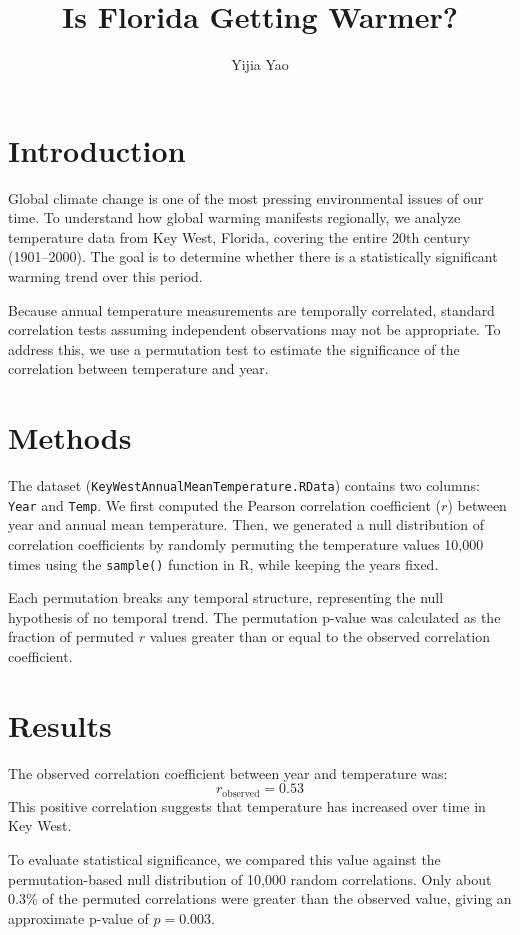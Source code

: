 \documentclass[a4paper,12pt]{article}
\title{\textbf{Is Florida Getting Warmer?}}
\author{Yijia Yao}
\date{}
\begin{document}
\maketitle
\doublespacing

\section*{Introduction}
Global climate change is one of the most pressing environmental issues of our time.
To understand how global warming manifests regionally, we analyze temperature data from Key West, Florida, covering the entire 20th century (1901–2000). 
The goal is to determine whether there is a statistically significant warming trend over this period.

Because annual temperature measurements are temporally correlated, standard correlation tests assuming independent observations may not be appropriate. 
To address this, we use a permutation test to estimate the significance of the correlation between temperature and year.

\section*{Methods}
The dataset (\texttt{KeyWestAnnualMeanTemperature.RData}) contains two columns: \texttt{Year} and \texttt{Temp}.
We first computed the Pearson correlation coefficient ($r$) between year and annual mean temperature.
Then, we generated a null distribution of correlation coefficients by randomly permuting the temperature values 10,000 times using the \texttt{sample()} function in R, while keeping the years fixed.

Each permutation breaks any temporal structure, representing the null hypothesis of no temporal trend.
The permutation p-value was calculated as the fraction of permuted $r$ values greater than or equal to the observed correlation coefficient.

\section*{Results}
The observed correlation coefficient between year and temperature was:
\[
r_{\text{observed}} = 0.53
\]
This positive correlation suggests that temperature has increased over time in Key West.

To evaluate statistical significance, we compared this value against the permutation-based null distribution of 10,000 random correlations. 
Only about 0.3\% of the permuted correlations were greater than the observed value, giving an approximate p-value of $p = 0.003$.
\end{document}
